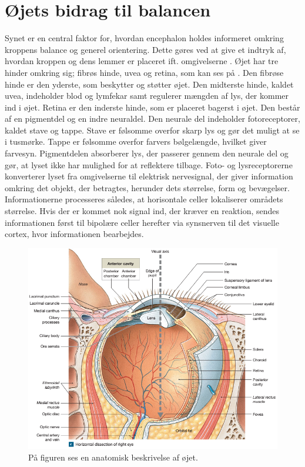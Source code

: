 \section{Øjets bidrag til balancen}
Synet er en central faktor for, hvordan encephalon holdes informeret omkring kroppens balance og generel orientering. Dette gøres ved at give et indtryk af, hvordan kroppen og dens lemmer er placeret ift. omgivelserne \cite{Schulmann1987}. Øjet har tre hinder omkring sig; fibrøs hinde, uvea og retina, som kan ses på . Den fibrøse hinde er den yderste, som beskytter og støtter øjet. Den midterste hinde, kaldet uvea, indeholder blod og lymfekar samt regulerer mængden af lys, der kommer ind i øjet. Retina er den inderste hinde, som er placeret bagerst i øjet. Den består af en pigmentdel og en indre neuraldel. Den neurale del indeholder fotoreceptorer, kaldet stave og tappe. Stave er følsomme overfor skarp lys og gør det muligt at se i tusmørke. Tappe er følsomme overfor farvers bølgelængde, hvilket giver farvesyn. Pigmentdelen absorberer lys, der passerer gennem den neurale del og gør, at lyset ikke har mulighed for at reflektere tilbage. Foto- og lysreceptorerne konverterer lyset fra omgivelserne til elektrisk nervesignal, der giver information omkring det objekt, der betragtes, herunder dets størrelse, form og bevægelser. Informationerne processeres således, at horisontale celler lokaliserer områdets størrelse. Hvis der er kommet nok signal ind, der kræver en reaktion, sendes informationen først til bipolære celler herefter via synsnerven til det visuelle cortex, hvor informationen bearbejdes. \cite{Martini2012}     

\begin{figure}[H]
	\centering
	\includegraphics[scale=0.75]{figures/bProblemanalyse/Oejets-anatomi.png}
	\caption{På figuren ses en anatomisk beskrivelse af øjet. \cite{Martini2012}}
	\label{Oejet}
\end{figure}

